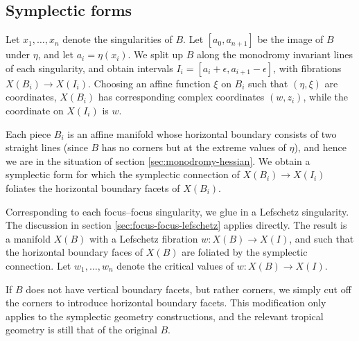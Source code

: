 \documentclass[12pt]{amsart}
\begin{document}



\subsection{Symplectic forms}
\label{sec:other-symplectic}


Let $x_1,\dots,x_n$ denote the singularities of $B$. Let
$[a_0,a_{n+1}]$ be the image of $B$ under $\eta$, and let $a_i =
\eta(x_i)$. We split up $B$ along the monodromy invariant lines of
each singularity, and obtain intervals $I_i =
[a_{i}+\epsilon,a_{i+1}-\epsilon]$, with fibrations $X(B_i) \to
X(I_i)$. Choosing an affine function $\xi$ on $B_i$ such that
$(\eta,\xi)$ are coordinates, $X(B_i)$ has corresponding complex
coordinates $(w,z_i)$, while the coordinate on $X(I_i)$ is $w$.

Each piece $B_i$ is an affine manifold whose horizontal boundary
consists of two straight lines (since $B$ has no corners but at the
extreme values of $\eta$), and hence we are in the situation of
section \ref{sec:monodromy-hessian}. We obtain a symplectic form for which the symplectic connection of $X(B_i)
\to X(I_i)$ foliates the horizontal boundary facets of $X(B_i)$.

Corresponding to each focus--focus singularity, we glue in a Lefschetz
singularity. The discussion in section
\ref{sec:focus-focus-lefschetz} applies directly. The result is a
manifold $X(B)$ with a Lefschetz fibration $w: X(B)\to X(I)$, and such
that the horizontal boundary faces of $X(B)$ are foliated by the
symplectic connection. Let $w_1,\dots,w_n$ denote the critical values
of $w: X(B)\to X(I)$. 

If $B$ does not have vertical boundary facets, but rather corners, we simply cut off the corners to introduce horizontal boundary facets. This modification only applies to the symplectic geometry constructions, and the relevant tropical geometry is still that of the original $B$.
\end{document}
